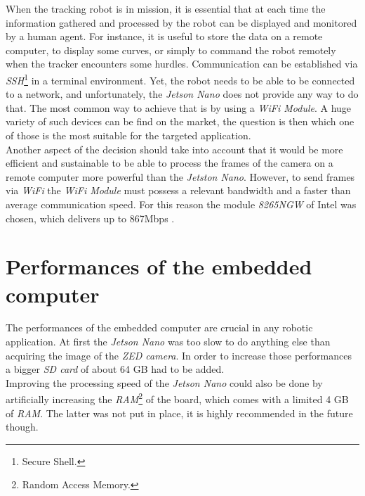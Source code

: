 		When the tracking robot is in mission, it is essential that 
		at each time the information gathered and processed by the
		robot can be displayed and monitored by a human agent.
		For instance, it is useful to store the data on a remote 
		computer, to display some curves, or 
		simply to command the robot remotely when the tracker encounters
		some hurdles. Communication can be established via \textit{SSH}\footnote{Secure Shell.}
		in a terminal environment. Yet, the robot needs to be able 
		to be connected to a network, and unfortunately, the 
		\textit{Jetson Nano} does not provide any way to do that. The most common way 
		to achieve that is by using a \textit{WiFi Module}. A huge 
		variety of such devices can be find on the market, the question 
		is then which one of those is the most suitable for the 
		targeted application.
		\\\indent Another aspect of the decision should take into 
		account that it would be more efficient and sustainable 
		to be able to process the frames of the camera on
		a remote computer more powerful than the \textit{Jetston Nano}.
		However, to send frames via \textit{WiFi} the \textit{ WiFi Module}
		must possess a relevant bandwidth and a faster than average communication
		speed. For this reason the module \textit{8265NGW} of Intel was chosen, which 
		delivers up to 867Mbps \cite{wifi}.
		
	\section{Performances of the embedded computer}
	
		The performances of the embedded computer are crucial in 
		any robotic application.
		At first the \textit{Jetson Nano} was too slow 
		to do anything else than acquiring the image of the \textit{ZED camera}.
		In order to increase those performances a bigger \textit{SD card} of 
		about 64 GB had to be added.
		\\\indent Improving the processing speed of the \textit{Jetson Nano}
		could also be done by artificially increasing the \textit{RAM}\footnote{Random Access
		Memory.} of the board, which comes with a limited 4 GB of \textit{RAM}. The latter
		was not put in place, it is highly recommended in the future though. \cite{swap}
	
